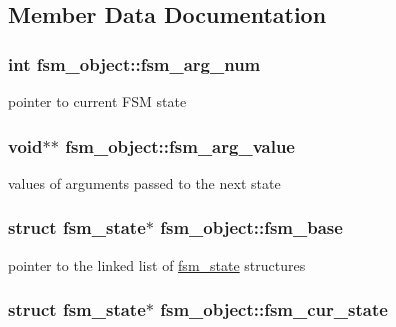 \subsection{Member Data Documentation}
\hypertarget{structfsm__object_a1e132e0f019f722123f4aff947352cca}{
\subsubsection[{fsm\_\-arg\_\-num}]{\setlength{\rightskip}{0pt plus 5cm}int {\bf fsm\_\-object::fsm\_\-arg\_\-num}}}
\label{structfsm__object_a1e132e0f019f722123f4aff947352cca}
pointer to current FSM state \hypertarget{structfsm__object_a9de2beefef0bfeb09802fa390187dd06}{
\subsubsection[{fsm\_\-arg\_\-value}]{\setlength{\rightskip}{0pt plus 5cm}void$\ast$$\ast$ {\bf fsm\_\-object::fsm\_\-arg\_\-value}}}
\label{structfsm__object_a9de2beefef0bfeb09802fa390187dd06}
values of arguments passed to the next state \hypertarget{structfsm__object_ad7a2507fbf7b66a8833e29eed8fb1184}{
\subsubsection[{fsm\_\-base}]{\setlength{\rightskip}{0pt plus 5cm}struct {\bf fsm\_\-state}$\ast$ {\bf fsm\_\-object::fsm\_\-base}}}
\label{structfsm__object_ad7a2507fbf7b66a8833e29eed8fb1184}
pointer to the linked list of \hyperlink{structfsm__state}{fsm\_\-state} structures \hypertarget{structfsm__object_ad5eb19f825d8f434149e720ad6d0fa4a}{
\subsubsection[{fsm\_\-cur\_\-state}]{\setlength{\rightskip}{0pt plus 5cm}struct {\bf fsm\_\-state}$\ast$ {\bf fsm\_\-object::fsm\_\-cur\_\-state}}}
